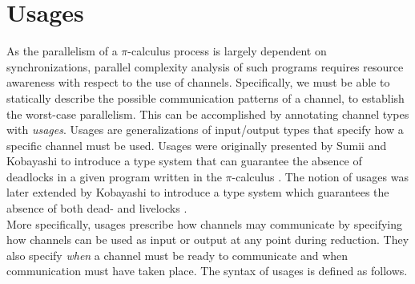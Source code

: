 \chapter{Usages}\label{sec:usages}

As the parallelism of a $\pi$-calculus process is largely dependent on synchronizations, parallel complexity analysis of such programs requires resource awareness with respect to the use of channels. Specifically, we must be able to statically describe the possible communication patterns of a channel, to establish the worst-case parallelism. This can be accomplished by annotating channel types with \textit{usages}. Usages are generalizations of input/output types that specify how a specific channel must be used. Usages were originally presented by Sumii and Kobayashi to introduce a type system that can guarantee the absence of deadlocks in a given program written in the $\pi$-calculus \cite{SumiiKobayashi1998}. The notion of usages was later extended by Kobayashi to introduce a type system which guarantees the absence of both dead- and livelocks \cite{Kobayashi2000}.\\

More specifically, usages prescribe how channels may communicate by specifying how channels can be used as input or output at any point during reduction. They also specify \textit{when} a channel must be ready to communicate and when communication must have taken place. The syntax of usages is defined as follows.


